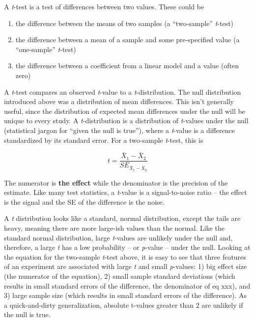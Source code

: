 \documentclass[]{book}
\providecommand{\tightlist}{%
  \setlength{\itemsep}{0pt}\setlength{\parskip}{0pt}}
\begin{document}
A \emph{t}-test is a test of differences between two values. These could
be

\begin{enumerate}
\def\labelenumi{\arabic{enumi}.}
\tightlist
\item
  the difference between the means of two samples (a ``two-sample''
  \emph{t}-test)
\item
  the difference between a mean of a sample and some pre-specified value
  (a ``one-sample'' \emph{t}-test)
\item
  the difference between a coefficient from a linear model and a value
  (often zero)
\end{enumerate}

A \emph{t}-test compares an observed \emph{t}-value to a
\emph{t}-distribution. The null distribution introduced above was a
distribution of mean differences. This isn't generally useful, since the
distribution of expected mean differences under the null will be unique
to every study. A \emph{t}-distribution is a distribution of
\emph{t}-values under the null (statistical jargon for ``given the null
is true''), where a \emph{t}-value is a difference standardized by its
standard error. For a two-sample \emph{t}-test, this is

\begin{equation}
t = \frac{\bar{X}_1 - \bar{X}_2}{SE_{\bar{X}_1 - \bar{X}_2}}
\end{equation}

The numerator is \textbf{the effect} while the denominator is the
precision of the estimate. Like many test statistics, a \emph{t}-value
is a signal-to-noise ratio -- the effect is the signal and the SE of the
difference is the noise.

A \emph{t} distribution looks like a standard, normal distribution,
except the tails are heavy, meaning there are more large-ish values than
the normal. Like the standard normal distribution, large \emph{t}-values
are unlikely under the null and, therefore, a large \emph{t} has a low
probability -- or \emph{p}-value -- under the null. Looking at the
equation for the two-sample \emph{t}-test above, it is easy to see that
three features of an experiment are associated with large \emph{t} and
small \emph{p}-values: 1) big effect size (the numerator of the
equation), 2) small sample standard deviations (which results in small
standard errors of the difference, the denominator of eq xxx), and 3)
large sample size (which results in small standard errors of the
difference). As a quick-and-dirty generalization, absolute t-values
greater than 2 are unlikely if the null is true.
\end{document}
